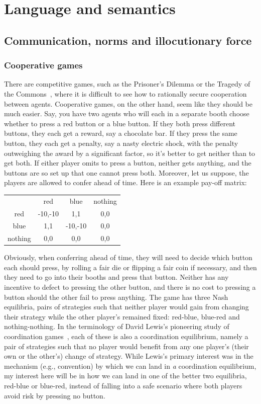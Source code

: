 \def\mychapter{VII}

\chapter{Language and semantics}\label{ch:semantics}
\section{Communication, norms and illocutionary force}
\subsection{Cooperative games}
There are competitive games, such as the Prisoner's Dilemma or the Tragedy of the Commons~\parencite{Hardin}, where it is difficult 
to see how to rationally secure cooperation between agents. Cooperative games, on the other hand, seem like
they should be much easier. Say, you have
two agents who will each in a separate booth choose whether to press a red button or a blue button. If they both
press different buttons, they each get a reward, say a chocolate bar. If they press the same button, they 
each get a penalty, say a nasty electric shock, with the penalty outweighing the award by a significant factor, so it's better 
to get neither than to get both. If either player omits to press a button, neither gets anything, and the buttons are so 
set up that one cannot press both. Moreover, let us suppose, the players are allowed to confer ahead of time. Here is an
example pay-off matrix:

\begin{center}
\begin{tabular}{ cccc }
\hline
    & red & blue & nothing \\
red & -10,-10 & 1,1  & 0,0 \\
blue & 1,1 & -10,-10 & 0,0 \\
nothing & 0,0 & 0,0 & 0,0 \\
\hline
\end{tabular}
\end{center}

Obviously, when conferring ahead of time, they will need to decide which button each should press, by rolling a fair die or
flipping a fair coin if
necessary, and then they need to go into their booths and press that button. Neither has any incentive to defect
to pressing the other button, and there is no cost to pressing a button should the other fail to press
anything. The game has three Nash equilibria, pairs of strategies such that neither player would gain from
changing their strategy while the other player's remained fixed: red-blue, blue-red and nothing-nothing. In 
the terminology of David Lewis's pioneering study of coordination games~\parencite{LewisConvention}, each of these is also a coordination 
equilibrium, namely a pair of strategies such that no player would benefit from any one player's (their own or the other's) change of strategy. While Lewis's primary interest was in the mechanism (e.g., convention) by which we can land
in \textit{a} coordination equilibrium, my interest here will be in how we can land in one of the better two equilibria,
red-blue or blue-red, instead of falling into a safe scenario where both players avoid risk by pressing no button. 

